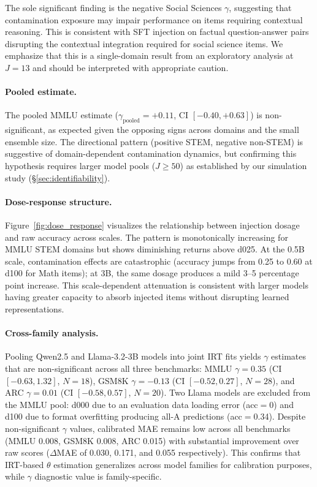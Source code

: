 The sole significant finding is the negative Social Sciences $\gamma$, suggesting that contamination exposure may impair performance on items requiring contextual reasoning. This is consistent with SFT injection on factual question-answer pairs disrupting the contextual integration required for social science items. We emphasize that this is a single-domain result from an exploratory analysis at $J = 13$ and should be interpreted with appropriate caution.

\paragraph{Pooled estimate.}
The pooled MMLU estimate ($\gamma_{\text{pooled}} = +0.11$, CI $[-0.40, +0.63]$) is non-significant, as expected given the opposing signs across domains and the small ensemble size. The directional pattern (positive STEM, negative non-STEM) is suggestive of domain-dependent contamination dynamics, but confirming this hypothesis requires larger model pools ($J \geq 50$) as established by our simulation study (\S\ref{sec:identifiability}).

\paragraph{Dose-response structure.}
Figure~\ref{fig:dose_response} visualizes the relationship between injection dosage and raw accuracy across scales. The pattern is monotonically increasing for MMLU STEM domains but shows diminishing returns above d025. At the 0.5B scale, contamination effects are catastrophic (accuracy jumps from 0.25 to 0.60 at d100 for Math items); at 3B, the same dosage produces a mild 3--5 percentage point increase. This scale-dependent attenuation is consistent with larger models having greater capacity to absorb injected items without disrupting learned representations.

\paragraph{Cross-family analysis.}
Pooling Qwen2.5 and Llama-3.2-3B models into joint IRT fits yields $\gamma$ estimates that are non-significant across all three benchmarks: MMLU $\gamma = 0.35$ (CI $[-0.63, 1.32]$, $N=18$), GSM8K $\gamma = -0.13$ (CI $[-0.52, 0.27]$, $N=28$), and ARC $\gamma = 0.01$ (CI $[-0.58, 0.57]$, $N=20$). Two Llama models are excluded from the MMLU pool: d000 due to an evaluation data loading error (acc$=$0) and d100 due to format overfitting producing all-A predictions (acc$=$0.34). Despite non-significant $\gamma$ values, calibrated MAE remains low across all benchmarks (MMLU 0.008, GSM8K 0.008, ARC 0.015) with substantial improvement over raw scores ($\Delta$MAE of 0.030, 0.171, and 0.055 respectively). This confirms that IRT-based $\theta$ estimation generalizes across model families for calibration purposes, while $\gamma$ diagnostic value is family-specific.

